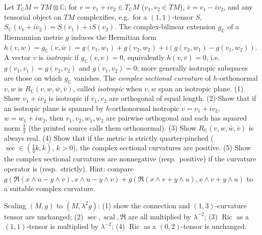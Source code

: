 \begin{remark}
  \label{rem:pet-ch3-ex-17}
  \leanok
  Let $T_{\mathbb C}M=TM\otimes\mathbb C$; for $v=v_1+iv_2\in T_{\mathbb C}M$
  ($v_1,v_2\in TM$), $\bar v=v_1-iv_2$, and any tensorial object on $TM$
  complexifies, e.g.\ for a $(1,1)$-tensor $S$,
  $S_{\mathbb C}(v_1+iv_2)=S(v_1)+iS(v_2)$. The complex-bilinear extension
  $g_{\mathbb C}$ of a Riemannian metric $g$ induces the Hermitian form
  $h(v,w)=g_{\mathbb C}(v,\bar w)
  =g(v_1,w_1)+g(v_2,w_2)+i(g(v_2,w_1)-g(v_1,w_2))$. A vector $v$
  is \emph{isotropic} if $g_{\mathbb C}(v,v)=0$, equivalently $h(v,\bar v)=0$, i.e.\
  $g(v_1,v_1)=g(v_2,v_2)$ and $g(v_1,v_2)=0$; more generally isotropic subspaces
  are those on which $g_{\mathbb C}$ vanishes. The \emph{complex sectional
  curvature} of $h$-orthonormal $v,w$ is $R_{\mathbb C}(v,w,\bar w,\bar v)$,
  called \emph{isotropic} when $v,w$ span an isotropic plane. (1) Show $v_1+iv_2$
  is isotropic if $v_1,v_2$ are orthogonal of equal length. (2) Show that if an
  isotropic plane is spanned by $h$-orthonormal isotropic $v=v_1+iv_2$,
  $w=w_1+iw_2$, then $v_1,v_2,w_1,w_2$ are pairwise orthogonal and each has
  squared norm $\tfrac12$ (the printed source calls them orthonormal). (3) Show
  $R_{\mathbb C}(v,w,\bar w,\bar v)$ is always real. (4) Show that if the metric
  is strictly quarter-pinched ($\sec\in(\tfrac14k,k)$, $k>0$), the complex
  sectional curvatures are positive. (5) Show the complex sectional curvatures
  are nonnegative (resp.\ positive) if the curvature operator is (resp.\
  strictly). Hint: compare
  $g(\mathfrak R(x\wedge u-y\wedge v),x\wedge u-y\wedge v)+g(\mathfrak R(x\wedge
  v+y\wedge u),x\wedge v+y\wedge u)$ to a suitable complex curvature.
\end{remark}

\begin{remark}[Curvature under metric scaling]
  \label{rem:pet-ch3-ex-18}
  \dcref{ch3:3.4.18}
  \leanok
  Scaling $(M,g)$ to $(M,\lambda^2g)$: (1) show the connection and $(1,3)$-curvature
  tensor are unchanged; (2) $\sec,\operatorname{scal},\mathfrak R$ are all
  multiplied by $\lambda^{-2}$; (3) $\operatorname{Ric}$ as a $(1,1)$-tensor is
  multiplied by $\lambda^{-2}$; (4) $\operatorname{Ric}$ as a $(0,2)$-tensor is
  unchanged.
\end{remark}


